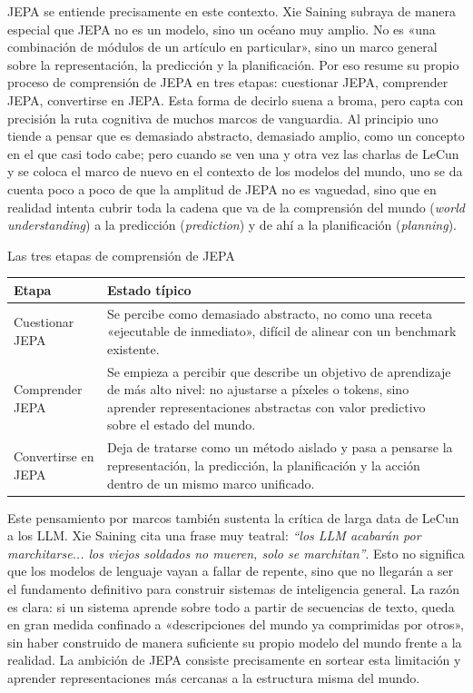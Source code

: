 JEPA se entiende precisamente en este contexto. Xie Saining subraya de manera especial que JEPA no es un modelo, sino un océano muy amplio. No es «una combinación de módulos de un artículo en particular», sino un marco general sobre la representación, la predicción y la planificación. Por eso resume su propio proceso de comprensión de JEPA en tres etapas: cuestionar JEPA, comprender JEPA, convertirse en JEPA. Esta forma de decirlo suena a broma, pero capta con precisión la ruta cognitiva de muchos marcos de vanguardia. Al principio uno tiende a pensar que es demasiado abstracto, demasiado amplio, como un concepto en el que casi todo cabe; pero cuando se ven una y otra vez las charlas de LeCun y se coloca el marco de nuevo en el contexto de los modelos del mundo, uno se da cuenta poco a poco de que la amplitud de JEPA no es vaguedad, sino que en realidad intenta cubrir toda la cadena que va de la comprensión del mundo (\textit{world understanding}) a la predicción (\textit{prediction}) y de ahí a la planificación (\textit{planning}).

\begin{importantbox}{Las tres etapas de comprensión de JEPA}
\begin{tabularx}{\textwidth}{>{\raggedright\arraybackslash}p{} Y}
\toprule
Etapa & Estado típico \\
\midrule
Cuestionar JEPA & Se percibe como demasiado abstracto, no como una receta «ejecutable de inmediato», difícil de alinear con un benchmark existente. \\
Comprender JEPA & Se empieza a percibir que describe un objetivo de aprendizaje de más alto nivel: no ajustarse a píxeles o tokens, sino aprender representaciones abstractas con valor predictivo sobre el estado del mundo. \\
Convertirse en JEPA & Deja de tratarse como un método aislado y pasa a pensarse la representación, la predicción, la planificación y la acción dentro de un mismo marco unificado. \\
\bottomrule
\end{tabularx}
\end{importantbox}

Este pensamiento por marcos también sustenta la crítica de larga data de LeCun a los LLM. Xie Saining cita una frase muy teatral: \textit{``los LLM acabarán por marchitarse... los viejos soldados no mueren, solo se marchitan''}. Esto no significa que los modelos de lenguaje vayan a fallar de repente, sino que no llegarán a ser el fundamento definitivo para construir sistemas de inteligencia general. La razón es clara: si un sistema aprende sobre todo a partir de secuencias de texto, queda en gran medida confinado a «descripciones del mundo ya comprimidas por otros», sin haber construido de manera suficiente su propio modelo del mundo frente a la realidad. La ambición de JEPA consiste precisamente en sortear esta limitación y aprender representaciones más cercanas a la estructura misma del mundo.

